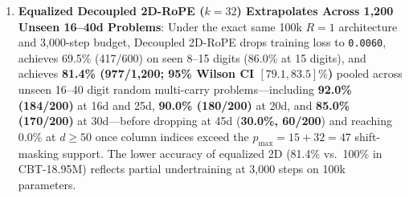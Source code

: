 \documentclass[10pt,twocolumn]{article}
\begin{document}
\begin{enumerate}[leftmargin=*,nosep]
    \item \textbf{Equalized Decoupled 2D-RoPE ($k=32$) Extrapolates Across 1,200 Unseen 16--40d Problems}: Under the exact same 100k $R=1$ architecture and 3,000-step budget, Decoupled 2D-RoPE drops training loss to \texttt{0.0060}, achieves 69.5\% (417/600) on seen 8--15 digits (86.0\% at 15 digits), and achieves \textbf{81.4\% (977/1,200; 95\% Wilson CI $[79.1, 83.5]\%$)} pooled across unseen 16--40 digit random multi-carry problems—including \textbf{92.0\% (184/200)} at 16d and 25d, \textbf{90.0\% (180/200)} at 20d, and \textbf{85.0\% (170/200)} at 30d—before dropping at 45d (\textbf{30.0\%, 60/200}) and reaching 0.0\% at $d \ge 50$ once column indices exceed the $p_{\max} = 15 + 32 = 47$ shift-masking support. The lower accuracy of equalized 2D (81.4\% vs.\ 100\% in CBT-18.95M) reflects partial undertraining at 3,000 steps on 100k parameters.
\end{enumerate}
\end{document}
